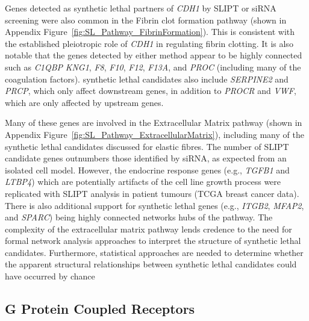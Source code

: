 Genes detected as \gls{synthetic lethal} partners of \textit{CDH1} by \gls{SLIPT} or \gls{siRNA} screening were also common in the Fibrin clot formation \gls{pathway} (shown in Appendix  Figure~\ref{fig:SL_Pathway_FibrinFormation}). This is consistent with the established pleiotropic role of \textit{CDH1} in regulating fibrin clotting. It is also notable that the genes detected by either method appear to be highly connected such as \textit{C1QBP} \textit{KNG1}, \textit{F8}, \textit{F10}, \textit{F12}, \textit{F13A}, and \textit{PROC} (including many of the coagulation factors). \Gls{synthetic lethal} candidates also include \textit{SERPINE2} and \textit{PRCP}, which only affect downstream genes, in addition to \textit{PROCR} and \textit{VWF}, which are only affected by upstream genes. 




Many of these genes are involved in the Extracellular Matrix \gls{pathway} (shown in Appendix Figure~\ref{fig:SL_Pathway_ExtracellularMatrix}), including many of the \gls{synthetic lethal} candidates discussed for elastic fibres. The number of \gls{SLIPT} candidate genes outnumbers those identified by \gls{siRNA}, as expected from an isolated cell model. However, the endocrine response genes (e.g., \textit{TGFB1} and \textit{LTBP4}) which are potentially artifacts of the cell line growth process were replicated with \gls{SLIPT} analysis in patient tumours (TCGA breast cancer data). There is also additional support for \gls{synthetic lethal} genes (e.g., \textit{ITGB2}, \textit{MFAP2}, and \textit{SPARC}) being highly connected networks hubs of the \gls{pathway}. The complexity of the extracellular matrix \gls{pathway} lends credence to the need for formal network analysis approaches to interpret the  structure of \gls{synthetic lethal} candidates. Furthermore, statistical approaches are needed to determine whether the apparent structural relationships between \gls{synthetic lethal} candidates could have occurred by chance 


\subsection{G Protein Coupled Receptors}  \label{chapt4:SL_Genes_GPCR}

